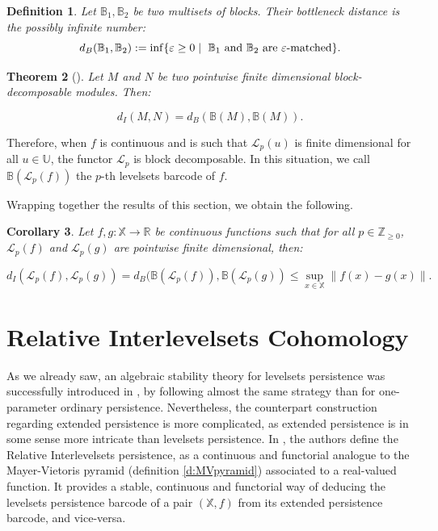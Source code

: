 \documentclass[11pt]{article}
\newtheorem{theorem}{Theorem}[section]
\newtheorem{corollary}[theorem]{Corollary}
\newtheorem{definition}[theorem]{Definition}
\theoremstyle{remark}
\newcommand{\Z}{\mathbb{Z}}
\newcommand{\R}{\mathbb{R}}
\newcommand{\X}{\mathbb{X}}
\begin{document}
\begin{definition}Let $\mathbb{B}_1,\mathbb{B}_2$ be two multisets of blocks. Their bottleneck distance is the possibly infinite number:
\[d_B(\mathbb{B}_1,\mathbb{B}_2) := \inf \{\varepsilon \geq 0 \mid ~\textnormal{$\mathbb{B}_1$ and $\mathbb{B}_2$ are $\varepsilon$-matched}\}.\]

\end{definition}

\begin{theorem}[\cite{Bjer16}]
Let $M$ and $N$ be two pointwise finite dimensional block-decomposable modules. Then:

\[d_I(M,N) = d_B(\mathbb{B}(M), \mathbb{B}(M)).\]
\end{theorem}



Therefore, when $f$ is continuous and is such that $\mathcal{L}_p(u)$ is finite dimensional for all $u\in \mathbb{U}$, the functor $\mathcal{L}_p$ is block decomposable. In this situation, we call $\mathbb{B}(\mathcal{L}_p(f))$ the $p$-th levelsets barcode of $f$.




Wrapping together the results of this section, we obtain the following.

\begin{corollary}

Let $f,g : \mathbb{X} \longrightarrow \R$ be  continuous functions such that for all $p\in \Z_{\geq 0}$, $\mathcal{L}_p(f)$ and $\mathcal{L}_p(g)$ are pointwise finite dimensional, then:

\[d_I(\mathcal{L}_p(f), \mathcal{L}_p(g)) = d_B(\mathbb{B}(\mathcal{L}_p(f)), \mathbb{B}(\mathcal{L}_p(g)) \leq \sup_{x\in \mathbb{X}}\|f(x) - g(x)\|.\]

\end{corollary}





\section{Relative Interlevelsets Cohomology}
\label{pyr2}

As we already saw, an algebraic stability theory for levelsets persistence was successfully introduced in \cite{2018}, by following almost the same strategy than for one-parameter ordinary persistence. Nevertheless, the counterpart construction regarding extended persistence is more complicated, as extended persistence is in some sense more intricate than levelsets persistence. In \cite{bauer2021structure}, the authors define the Relative Interlevelsets persistence, as a continuous and functorial analogue to the Mayer-Vietoris pyramid (definition \ref{d:MVpyramid}) associated to a real-valued function. It provides a stable, continuous and functorial way of deducing the levelsets persistence barcode of a pair $(\X,f)$ from its extended persistence barcode, and vice-versa.
\end{document}
